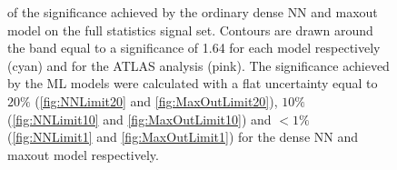 \begin{figure}[H]
{    of the significance achieved by the ordinary dense \acs{NN} and maxout model on the full statistics signal set. Contours are drawn 
    around the band equal to a significance of 1.64 for each model respectively (cyan) and for the \acs{ATLAS} analysis \cite{atlas_search_2021} (pink). The 
    significance achieved by the \acs{ML} models were calculated with a flat uncertainty equal to $20\%$ (\ref{fig:NNLimit20} and \ref{fig:MaxOutLimit20}),
    $10\%$ (\ref{fig:NNLimit10} and \ref{fig:MaxOutLimit10}) and $<1\%$ (\ref{fig:NNLimit1} and \ref{fig:MaxOutLimit1}) for the dense \acs{NN} and maxout model
    respectively.}
\end{figure}